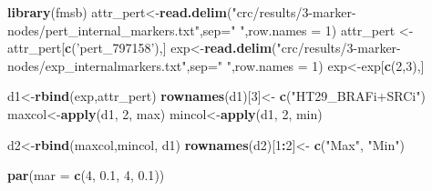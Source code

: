 \documentclass[
]{book}
\newenvironment{Shaded}{\begin{snugshade}}{\end{snugshade}}
\newcommand{\DataTypeTok}[1]{\textcolor[rgb]{0.13,0.29,0.53}{#1}}
\newcommand{\DecValTok}[1]{\textcolor[rgb]{0.00,0.00,0.81}{#1}}
\newcommand{\FloatTok}[1]{\textcolor[rgb]{0.00,0.00,0.81}{#1}}
\newcommand{\KeywordTok}[1]{\textcolor[rgb]{0.13,0.29,0.53}{\textbf{#1}}}
\newcommand{\NormalTok}[1]{#1}
\newcommand{\OperatorTok}[1]{\textcolor[rgb]{0.81,0.36,0.00}{\textbf{#1}}}
\newcommand{\StringTok}[1]{\textcolor[rgb]{0.31,0.60,0.02}{#1}}
\begin{document}
\begin{Shaded}
\begin{Highlighting}[]
\KeywordTok{library}\NormalTok{(fmsb)}
\NormalTok{attr_pert<-}\KeywordTok{read.delim}\NormalTok{(}\StringTok{"crc/results/3-marker-nodes/pert_internal_markers.txt"}\NormalTok{,}\DataTypeTok{sep=}\StringTok{" "}\NormalTok{,}\DataTypeTok{row.names =} \DecValTok{1}\NormalTok{)}
\NormalTok{attr_pert <-attr_pert[}\KeywordTok{c}\NormalTok{(}\StringTok{'pert_797158'}\NormalTok{),]}
\NormalTok{exp<-}\KeywordTok{read.delim}\NormalTok{(}\StringTok{"crc/results/3-marker-nodes/exp_internalmarkers.txt"}\NormalTok{,}\DataTypeTok{sep=}\StringTok{" "}\NormalTok{,}\DataTypeTok{row.names =} \DecValTok{1}\NormalTok{)}
\NormalTok{exp<-exp[}\KeywordTok{c}\NormalTok{(}\DecValTok{2}\NormalTok{,}\DecValTok{3}\NormalTok{),]}

\NormalTok{d1<-}\KeywordTok{rbind}\NormalTok{(exp,attr_pert)}
\KeywordTok{rownames}\NormalTok{(d1)[}\DecValTok{3}\NormalTok{]<-}\StringTok{ }\KeywordTok{c}\NormalTok{(}\StringTok{"HT29_BRAFi+SRCi"}\NormalTok{)}
\NormalTok{maxcol<-}\KeywordTok{apply}\NormalTok{(d1, }\DecValTok{2}\NormalTok{, max)}
\NormalTok{mincol<-}\KeywordTok{apply}\NormalTok{(d1, }\DecValTok{2}\NormalTok{, min)}

\NormalTok{d2<-}\KeywordTok{rbind}\NormalTok{(maxcol,mincol, d1)}
\KeywordTok{rownames}\NormalTok{(d2)[}\DecValTok{1}\OperatorTok{:}\DecValTok{2}\NormalTok{]<-}\StringTok{ }\KeywordTok{c}\NormalTok{(}\StringTok{"Max"}\NormalTok{, }\StringTok{"Min"}\NormalTok{)}

\KeywordTok{par}\NormalTok{(}\DataTypeTok{mar =} \KeywordTok{c}\NormalTok{(}\DecValTok{4}\NormalTok{, }\FloatTok{0.1}\NormalTok{, }\DecValTok{4}\NormalTok{, }\FloatTok{0.1}\NormalTok{))}



\end{Highlighting}
\end{Shaded}
\end{document}
